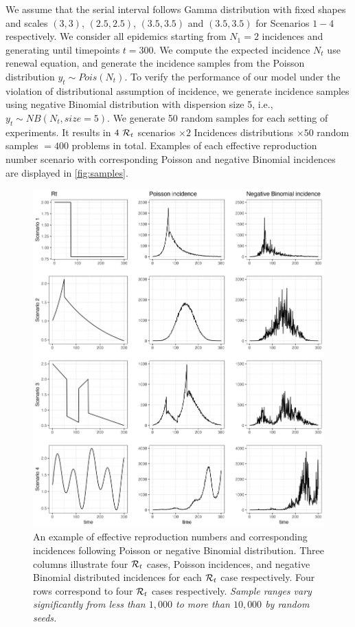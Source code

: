 We assume that the serial interval follows Gamma distribution with fixed shapes and scales $(3,3)$, $(2.5,2.5)$, $(3.5,3.5)$ and $(3.5,3.5)$ for Scenarios $1-4$ respectively. We consider all epidemics starting from $N_1=2$ incidences and generating until timepoints $t=300$. We compute the expected incidence $N_t$ use renewal equation, and generate the incidence samples from the Poisson distribution $y_t\sim Pois(N_t)$. 
To verify the performance of our model under the violation of distributional assumption of incidence, we generate incidence samples using negative Binomial distribution with dispersion size 5, i.e., $y_t\sim NB(N_t, {size=}5)$. We generate 50 random samples for each setting of experiments. It results in $4\ \mathcal{R}_t$ scenarios $\times 2$ Incidences distributions $\times 50$ random samples $= 400$ problems in total. 
Examples of each effective reproduction number scenario with corresponding Poisson and negative Binomial incidences are displayed in \autoref{fig:samples}. 
\begin{figure}[tb]
    \centering
    \includegraphics[width=140mm]{fig/plot_samples.png}
    \caption{An example of effective reproduction numbers and corresponding incidences following Poisson or negative Binomial distribution. Three columns illustrate four $\mathcal{R}_t$ cases, Poisson incidences, and negative Binomial distributed incidences for each $\mathcal{R}_t$ case respectively. Four rows correspond to four $\mathcal{R}_t$ cases respectively. \textit{Sample ranges vary significantly from less than $1,000$ to more than $10,000$ by random seeds.} } 
    \label{fig:samples}
\end{figure}

